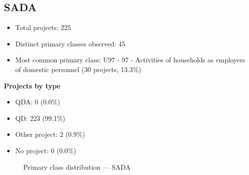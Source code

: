 \subsection{SADA}

\begin{itemize}
    \item Total projects: 225
    \item Distinct primary classes observed: 45
    \item Most common primary class: U97 - 97 - Activities of households as employers of domestic personnel (30 projects, 13.3\%)
\end{itemize}
\textbf{Projects by type}
\begin{itemize}
    \item QDA: 0 (0.0\%)
    \item QD: 223 (99.1\%)
    \item Other project: 2 (0.9\%)
    \item No project: 0 (0.0\%)
\end{itemize}

\begin{figure}[h]
    \centering
    
    \caption{Primary class distribution --- SADA}
\end{figure}

